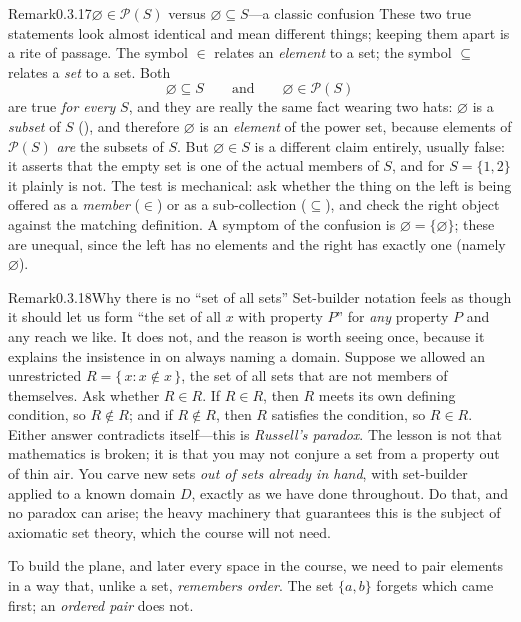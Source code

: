 \documentclass[main.tex]{subfiles}
\begin{document}
\begin{ObjL}{Remark}{0.3.17}{$\varnothing\in\mathcal P(S)$ versus $\varnothing\subseteq S$---a
classic confusion}
These two true statements look almost identical and mean different things; keeping them apart is a
rite of passage. The symbol $\in$ relates an \emph{element} to a set; the symbol $\subseteq$ relates a
\emph{set} to a set. Both
\[
\varnothing\subseteq S \qquad\text{and}\qquad \varnothing\in\mathcal P(S)
\]
are true \emph{for every} $S$, and they are really the same fact wearing two hats: $\varnothing$ is a
\emph{subset} of $S$ (), and therefore $\varnothing$ is an \emph{element} of the power set,
because elements of $\mathcal P(S)$ \emph{are} the subsets of $S$. But $\varnothing\in S$ is a
different claim entirely, usually false: it asserts that the empty set is one of the actual members of
$S$, and for $S=\{1,2\}$ it plainly is not. The test is mechanical: ask whether the thing on the left
is being offered as a \emph{member} ($\in$) or as a sub-collection ($\subseteq$), and check the right
object against the matching definition. A symptom of the confusion is $\varnothing=\{\varnothing\}$;
these are unequal, since the left has no elements and the right has exactly one (namely
$\varnothing$).
\end{ObjL}

\begin{ObjL}{Remark}{0.3.18}{Why there is no ``set of all sets''}
Set-builder notation feels as though it should let us form ``the set of all $x$ with property $P$''
for \emph{any} property $P$ and any reach we like. It does not, and the reason is worth seeing once,
because it explains the insistence in  on always naming a domain. Suppose we allowed an
unrestricted $R=\{\,x : x\notin x\,\}$, the set of all sets that are not members of themselves. Ask
whether $R\in R$. If $R\in R$, then $R$ meets its own defining condition, so $R\notin R$; and if
$R\notin R$, then $R$ satisfies the condition, so $R\in R$. Either answer contradicts itself---this is
\emph{Russell's paradox}. The lesson is not that mathematics is broken; it is that you may not conjure
a set from a property out of thin air. You carve new sets \emph{out of sets already in hand}, with
set-builder applied to a known domain $D$, exactly as we have done throughout. Do that, and no paradox
can arise; the heavy machinery that guarantees this is the subject of axiomatic set theory, which the
course will not need.
\end{ObjL}

\noindent To build the plane, and later every space in the course, we need to pair elements in a way
that, unlike a set, \emph{remembers order}. The set $\{a,b\}$ forgets which came first; an
\emph{ordered pair} does not.
\end{document}
